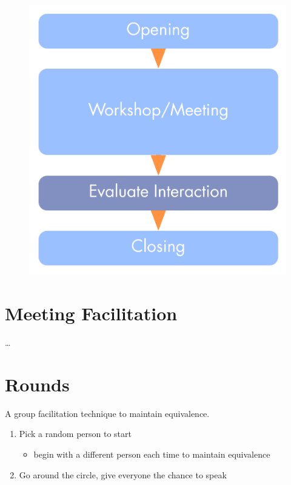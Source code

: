 \begin{figure}[htbp]
\centering
\includegraphics[keepaspectratio,width=\textwidth,height=0.75\textheight]{img/meetings/evaluate-interactions.png}
\end{figure}

\section{Meeting Facilitation}
\label{meetingfacilitation}

{\ldots}

\section{Rounds}
\label{rounds}

A group facilitation technique to maintain equivalence.

\begin{enumerate}
\item Pick a random person to start

\begin{itemize}
\item begin with a different person each time to maintain equivalence

\end{itemize}

\item Go around the circle, give everyone the chance to speak

\end{enumerate}

